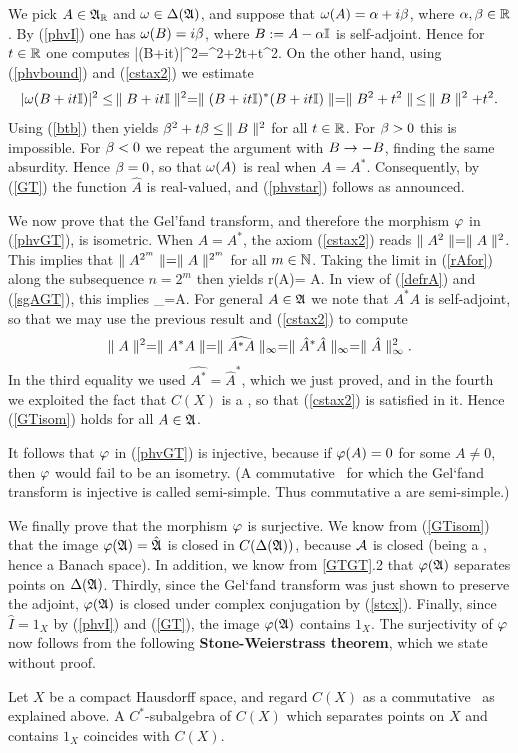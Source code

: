 We pick $A\in{\frak A}_{\Bbb R}$ and $\omega\in\Delta({\frak A})$, and suppose that $\omega(A)=\alpha+i\beta$,
where $\alpha,\beta\in{\Bbb R}$. By (\ref{phvI}) one has $\omega(B)=i\beta$, where
$B:=A-\alpha{\Bbb I}$ is self-adjoint. Hence for $t\in{\Bbb R}$ one computes \be
|\om(B+it\I)|^2=\bt^2+2t\bt+t^2.  \ee On the other hand, using
(\ref{phvbound}) and (\ref{cstax2}) we estimate
$$
|\omega(B+it{\Bbb I})|^2\leq\,\parallel B+it{\Bbb I}\parallel^2=\parallel (B+it{\Bbb I})^*(B+it{\Bbb I})\parallel= \parallel
B^2+t^2\parallel\,\leq\,\parallel B\parallel^2+t^2.
$$
Using (\ref{btb}) then yields $\beta^2 +t\beta\leq\, \parallel B\parallel^2$ for all
$t\in{\Bbb R}$.  For $\beta>0$ this is impossible. For $\beta<0$ we repeat the
argument with $B\rightarrow -B$, finding the same absurdity. Hence $\beta=0$,
so that $\omega(A)$ is real when $A=A^*$. Consequently, by (\ref{GT}) the
function $\hat{A}$ is real-valued, and (\ref{phvstar}) follows as
announced.

We now prove that the Gel'fand transform, and therefore the morphism
$\varphi$ in (\ref{phvGT}), is isometric. When $A=A^*$, the axiom
(\ref{cstax2}) reads $\parallel A^2\parallel=\parallel A\parallel^2$. This implies that $\parallel
A^{2^m}\parallel=\parallel A\parallel^{2^m}$ for all $m\in\Bbb N$.  Taking the limit in
(\ref{rAfor}) along the subsequence $n=2^m$ then yields \be r(A)=\n
A\n.  \ee In view of (\ref{defrA}) and (\ref{sgAGT}), this implies \be
\n{}\n_{\infty}=\n A\n.  \ee For general $A\in{\frak A}$ we
note that $A^*A$ is self-adjoint, so that we may use the previous
result and (\ref{cstax2}) to compute
$$
\parallel A\parallel^2=\parallel A^*A\parallel=\parallel \widehat{A^*A}\parallel_{\infty} =\parallel
\hat{A}^*\hat{A}\parallel_{\infty} =\parallel\hat{A}\parallel_{\infty}^2.
$$
In the third equality we used $\widehat{A^*}=\hat{A}^*$, which we just
proved, and in the fourth we exploited the fact that $C(X)$ is a \ca,
so that (\ref{cstax2}) is satisfied in it. Hence (\ref{GTisom}) holds
for all $A\in{\frak A}$.

It follows that $\varphi$ in (\ref{phvGT}) is injective, because if
$\varphi(A)=0$ for some $A\neq 0$, then $\varphi$ would fail to be an
isometry. (A commutative \BA\ for which the Gel`fand transform is
injective is called {semi-simple}. Thus commutative \ca a are
semi-simple.)

We finally prove that the morphism $\varphi$ is surjective. We know from
(\ref{GTisom}) that the image $\varphi({\frak A})=\hat{{\frak A}}$ is closed in
$C(\Delta({\frak A}))$, because ${\cal A}$ is closed (being a \ca, hence a Banach space).
In addition, we know from \ref{GTGT}.2 that $\varphi({\frak A})$ separates
points on $\Delta({\frak A})$. Thirdly, since the Gel`fand transform was just shown
to preserve the adjoint, $\varphi({\frak A})$ is closed under complex
conjugation by (\ref{stcx}). Finally, since $\hat{I}=1_X$ by
(\ref{phvI}) and (\ref{GT}), the image $\varphi({\frak A})$ contains $1_X$.  The
surjectivity of $\varphi$ now follows from the following {\bf
Stone-Weierstrass theorem}, which we state without proof.
\begin{Lemma} 
Let $X$ be a compact Hausdorff space, and regard $C(X)$ as a
commutative \ca\ as explained above.  A $C^*$-subalgebra of $C(X)$
which separates points on $X$ and contains $1_X$ coincides with
$C(X)$. \end{Lemma}

